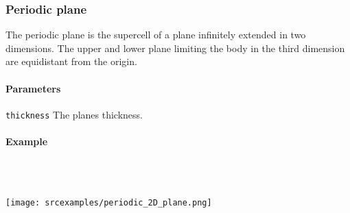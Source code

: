 \subsubsection{Periodic plane}
The periodic plane is the supercell of a plane infinitely extended in two dimensions. The upper and lower plane limiting the body in the third dimension are equidistant from the origin.

\paragraph{Parameters}
\begin{description}
 \item{\lstinline{thickness}} The planes thickness.
\end{description}

\paragraph{Example}\ 


\ \\\texttt{[image: srcexamples/periodic\_2D\_plane.png]}